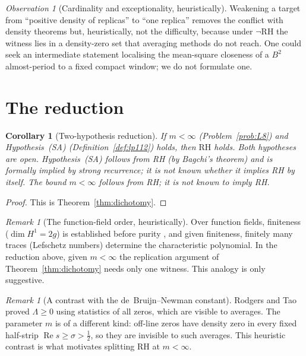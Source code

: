 \documentclass[11pt]{amsart}
\newtheorem{corollary}[theorem]{Corollary}
\theoremstyle{definition}
\theoremstyle{remark}
\newtheorem{remark}[theorem]{Remark}
\newtheorem{observation}[theorem]{Observation}
\newcommand{\RH}{\mathrm{RH}}
\DeclareMathOperator{\Real}{Re}
\begin{document}
\begin{observation}[Cardinality and exceptionality, heuristically]\label{obs:cardinal}
Weakening a target from ``positive density of replicas'' to ``one replica''
removes the conflict with density theorems but, heuristically, not the
difficulty, because under $\neg\RH$ the witness lies in a density-zero set
that averaging methods do not reach. One could seek an intermediate
statement localising the mean-square closeness of a $B^2$ almost-period to a
fixed compact window; we do not formulate one.
\end{observation}

\section{The reduction}\label{sec:architecture}

\begin{corollary}[Two-hypothesis reduction]\label{thm:architecture}
If $m<\infty$ (Problem~\ref{prob:L8}) and Hypothesis~(SA)
(Definition~\ref{def:lp112}) holds, then $\RH$ holds. Both hypotheses are
open. Hypothesis~(SA) follows from RH (by Bagchi's theorem) and is formally
implied by strong recurrence; it is not known whether it implies RH by
itself. The bound $m<\infty$ follows from RH; it is not known to imply RH.
\end{corollary}

\begin{proof}
This is Theorem~\ref{thm:dichotomy}.
\end{proof}

\begin{remark}[The function-field order, heuristically]
Over function fields, finiteness ($\dim H^1=2g$) is established before
purity \cite{Weil49,Del74}, and given finiteness, finitely many traces
(Lefschetz numbers) determine the characteristic polynomial. In the
reduction above, given $m<\infty$ the replication argument of
Theorem~\ref{thm:dichotomy} needs only one witness. This analogy is only
suggestive.
\end{remark}

\begin{remark}[A contrast with the de~Bruijn--Newman constant]
Rodgers and Tao proved $\Lambda\ge0$ \cite{RT20} using statistics of all
zeros, which are visible to averages. The parameter $m$ is of a different
kind: off-line zeros have density zero in every fixed half-strip
$\Real s\ge\sigma>\tfrac12$, so they are invisible to such averages. This
heuristic contrast is what motivates splitting RH at $m<\infty$.
\end{remark}
\end{document}
